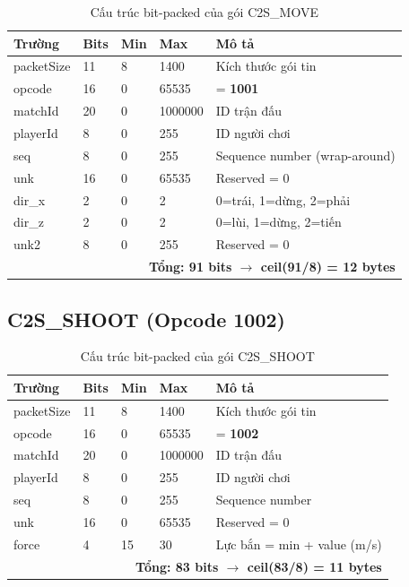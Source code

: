 \documentclass[12pt,a4paper]{report}
\begin{document}
\begin{table}[H]
\centering
\caption{Cấu trúc bit-packed của gói C2S\_MOVE}
\label{tab:c2smove}
\begin{tabular}{lllll}
\toprule
\textbf{Trường} & \textbf{Bits} & \textbf{Min} & \textbf{Max} & \textbf{Mô tả} \\
\midrule
packetSize & 11 & 8      & 1400    & Kích thước gói tin \\
opcode     & 16 & 0      & 65535   & = \textbf{1001} \\
matchId    & 20 & 0      & 1000000 & ID trận đấu \\
playerId   &  8 & 0      & 255     & ID người chơi \\
seq        &  8 & 0      & 255     & Sequence number (wrap-around) \\
unk        & 16 & 0      & 65535   & Reserved = 0 \\
dir\_x     &  2 & 0      & 2       & 0=trái, 1=dừng, 2=phải \\
dir\_z     &  2 & 0      & 2       & 0=lùi,  1=dừng, 2=tiến \\
unk2       &  8 & 0      & 255     & Reserved = 0 \\
\midrule
\multicolumn{5}{r}{\textbf{Tổng: 91 bits $\rightarrow$ ceil(91/8) = 12 bytes}} \\
\bottomrule
\end{tabular}
\end{table}

\subsection{C2S\_SHOOT (Opcode 1002)}

\begin{table}[H]
\centering
\caption{Cấu trúc bit-packed của gói C2S\_SHOOT}
\label{tab:c2sshoot}
\begin{tabular}{lllll}
\toprule
\textbf{Trường} & \textbf{Bits} & \textbf{Min} & \textbf{Max} & \textbf{Mô tả} \\
\midrule
packetSize & 11 & 8      & 1400    & Kích thước gói tin \\
opcode     & 16 & 0      & 65535   & = \textbf{1002} \\
matchId    & 20 & 0      & 1000000 & ID trận đấu \\
playerId   &  8 & 0      & 255     & ID người chơi \\
seq        &  8 & 0      & 255     & Sequence number \\
unk        & 16 & 0      & 65535   & Reserved = 0 \\
force      &  4 & 15     & 30      & Lực bắn = min + value (m/s) \\
\midrule
\multicolumn{5}{r}{\textbf{Tổng: 83 bits $\rightarrow$ ceil(83/8) = 11 bytes}} \\
\bottomrule
\end{tabular}
\end{table}
\end{document}
